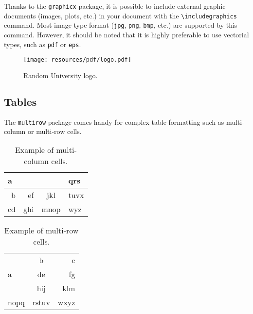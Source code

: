 \documentclass[a4paper, 12pt]{report}
\def\tbs{\textbackslash}
\begin{document}
    Thanks to the \texttt{graphicx} package, it is possible to include external graphic documents (images, plots, etc.) in your document with the \texttt{\tbs{}includegraphics} command. Most image type format (\texttt{jpg}, \texttt{png}, \texttt{bmp}, etc.) are supported by this command. However, it should be noted that it is highly preferable to use vectorial types, such as \texttt{pdf} or \texttt{eps}.

    \begin{figure}[h]
        \centering
        \texttt{[image: resources/pdf/logo.pdf]}
        \caption{Random University logo.}
        \label{fig:random_university_logo}
    \end{figure}

    \subsection{Tables}

    The \texttt{multirow} package comes handy for complex table formatting such as multi-column or multi-row cells.

    \begin{table}[H]
        \centering
        \begin{tabular}{|r|r|c|l|}
            \hline
            \multicolumn{3}{|l|}{a} & qrs  \\ \hline
             b &  ef &     jkl      & tuvx \\ \hline
            cd & ghi &     mnop     & wyz  \\ \hline
        \end{tabular}
        \caption{Example of multi-column cells.}
        \label{tab:multicol_example}
    \end{table}

    \begin{table}[H]
        \centering
        \begin{tabular}{|l|c|r|}
            \hline
            \multirow{3}{2cm}{a} &   b   &    c \\ \cline{2-3}
                                 &  de   &   fg \\ \cline{2-3}
                                 &  hij  &  klm \\ \hline
            nopq                 & rstuv & wxyz \\ \hline
        \end{tabular}
        \caption{Example of multi-row cells.}
        \label{tab:multirow_example}
    \end{table}
\end{document}
